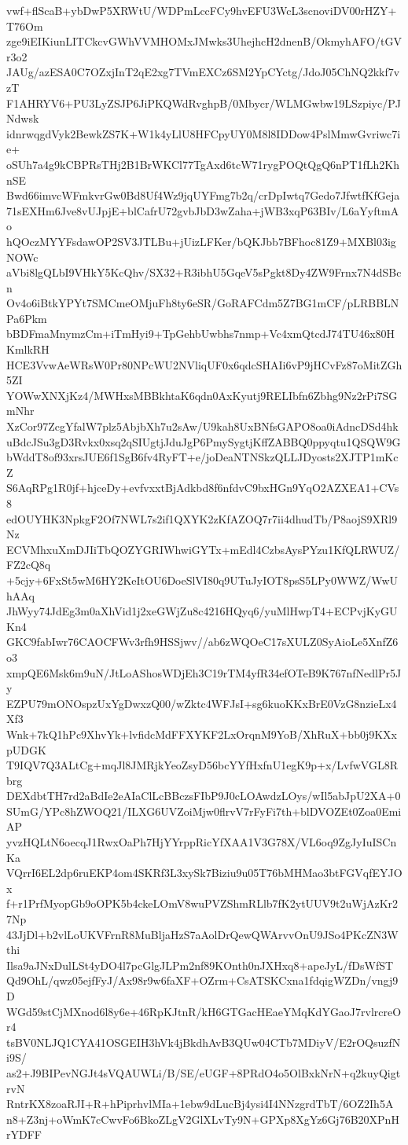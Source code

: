 vwf+flScaB+ybDwP5XRWtU/WDPmLccFCy9hvEFU3WcL3scnoviDV00rHZY+T76Om
zge9iEIKiunLITCkcvGWhVVMHOMxJMwks3UhejhcH2dnenB/OkmyhAFO/tGVr3o2
JAUg/azESA0C7OZxjInT2qE2xg7TVmEXCz6SM2YpCYctg/JdoJ05ChNQ2kkf7vzT
F1AHRYV6+PU3LyZSJP6JiPKQWdRvghpB/0Mbycr/WLMGwbw19LSzpiyc/PJNdwsk
idnrwqgdVyk2BewkZS7K+W1k4yLlU8HFCpyUY0M8l8IDDow4PslMmwGvriwc7ie+
oSUh7a4g9kCBPRsTHj2B1BrWKCl77TgAxd6tcW71rygPOQtQgQ6nPT1fLh2KhnSE
Bwd66imvcWFmkvrGw0Bd8Uf4Wz9jqUYFmg7b2q/crDpIwtq7Gedo7JfwtfKfGeja
71sEXHm6Jve8vUJpjE+blCafrU72gvbJbD3wZaha+jWB3xqP63BIv/L6aYyftmAo
hQOczMYYFsdawOP2SV3JTLBu+jUizLFKer/bQKJbb7BFhoc81Z9+MXBl03igNOWc
aVbi8lgQLbI9VHkY5KcQhv/SX32+R3ibhU5GqeV5sPgkt8Dy4ZW9Frnx7N4dSBcn
Ov4o6iBtkYPYt7SMCmeOMjuFh8ty6eSR/GoRAFCdm5Z7BG1mCF/pLRBBLNPa6Pkm
bBDFmaMnymzCm+iTmHyi9+TpGehbUwbhs7nmp+Vc4xmQtcdJ74TU46x80HKmlkRH
HCE3VvwAeWRsW0Pr80NPcWU2NVliqUF0x6qdcSHAIi6vP9jHCvFz87oMitZGh5ZI
YOWwXNXjKz4/MWHxsMBBkhtaK6qdn0AxKyutj9RELIbfn6Zbhg9Nz2rPi7SGmNhr
XzCor97ZcgYfalW7plz5AbjbXh7u2sAw/U9kah8UxBNfsGAPO8oa0iAdncDSd4hk
uBdcJSu3gD3Rvkx0xsq2qSIUgtjJduJgP6PmySygtjKffZABBQ0ppyqtu1QSQW9G
bWddT8of93xrsJUE6f1SgB6fv4RyFT+e/joDeaNTNSkzQLLJDyosts2XJTP1mKcZ
S6AqRPg1R0jf+hjceDy+evfvxxtBjAdkbd8f6nfdvC9bxHGn9YqO2AZXEA1+CVs8
edOUYHK3NpkgF2Of7NWL7s2if1QXYK2zKfAZOQ7r7ii4dhudTb/P8aojS9XRl9Nz
ECVMhxuXmDJIiTbQOZYGRIWhwiGYTx+mEdl4CzbsAysPYzu1KfQLRWUZ/FZ2cQ8q
+5cjy+6FxSt5wM6HY2KeItOU6DoeSlVI80q9UTuJyIOT8psS5LPy0WWZ/WwUhAAq
JhWyy74JdEg3m0aXhVid1j2xeGWjZu8c4216HQyq6/yuMlHwpT4+ECPvjKyGUKn4
GKC9fabIwr76CAOCFWv3rfh9HSSjwv//ab6zWQOeC17sXULZ0SyAioLe5XnfZ6o3
xmpQE6Msk6m9uN/JtLoAShosWDjEh3C19rTM4yfR34efOTeB9K767nfNedlPr5Jy
EZPU79mONOspzUxYgDwxzQ00/wZktc4WFJsI+sg6kuoKKxBrE0VzG8nzieLx4Xf3
Wnk+7kQ1hPc9XhvYk+lvfidcMdFFXYKF2LxOrqnM9YoB/XhRuX+bb0j9KXxpUDGK
T9IQV7Q3ALtCg+mqJl8JMRjkYeoZsyD56bcYYfHxfnU1egK9p+x/LvfwVGL8Rbrg
DEXdbtTH7rd2aBdIe2eAIaClLcBBczsFIbP9J0cLOAwdzLOys/wIl5abJpU2XA+0
SUmG/YPc8hZWOQ21/ILXG6UVZoiMjw0flrvV7rFyFi7th+blDVOZEt0Zoa0EmiAP
yvzHQLtN6oecqJ1RwxOaPh7HjYYrppRicYfXAA1V3G78X/VL6oq9ZgJyIuISCnKa
VQrrI6EL2dp6ruEKP4om4SKRf3L3xySk7Biziu9u05T76bMHMao3btFGVqfEYJOx
f+r1PrfMyopGb9oOPK5b4ckeLOmV8wuPVZShmRLlb7fK2ytUUV9t2uWjAzKr27Np
43JjDl+b2vlLoUKVFrnR8MuBljaHzS7aAolDrQewQWArvvOnU9JSo4PKcZN3Wthi
Ilsa9aJNxDulLSt4yDO4l7pcGlgJLPm2nf89KOnth0nJXHxq8+apeJyL/fDsWfST
Qd9OhL/qwz05ejfFyJ/Ax98r9w6faXF+OZrm+CsATSKCxna1fdqigWZDn/vngj9D
WGd59stCjMXnod6l8y6e+46RpKJtnR/kH6GTGacHEaeYMqKdYGaoJ7rvlrcreOr4
tsBV0NLJQ1CYA41OSGEIH3hVk4jBkdhAvB3QUw04CTb7MDiyV/E2rOQsuzfNi9S/
as2+J9BIPevNGJt4sVQAUWLi/B/SE/eUGF+8PRdO4o5OlBxkNrN+q2kuyQigtrvN
RntrKX8zoaRJI+R+hPiprhvlMIa+1ebw9dLucBj4ysi4I4NNzgrdTbT/6OZ2Ih5A
n8+Z3nj+oWmK7cCwvFo6BkoZLgV2GlXLvTy9N+GPXp8XgYz6Gj76B20XPnHrYDFF
